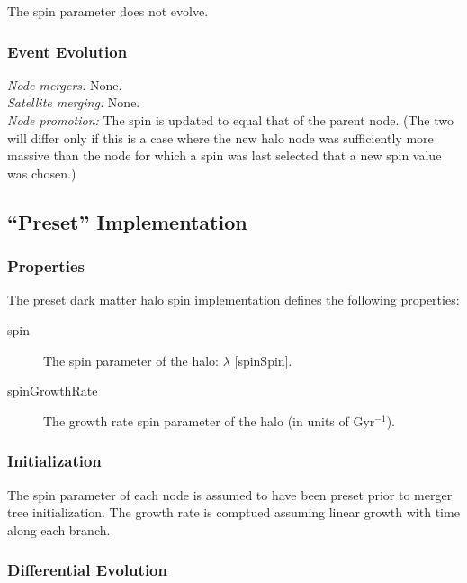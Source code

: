 The spin parameter does not evolve.

\subsubsection{Event Evolution}

\noindent\emph{Node mergers:} None.\\

\noindent\emph{Satellite merging:} None.\\

\noindent\emph{Node promotion:} The spin is updated to equal that of the parent node. (The two will differ only if this is a case where the new halo \gls{node} was sufficiently more massive than the \gls{node} for which a spin was last selected that a new spin value was chosen.)\\

\subsection{``Preset'' Implementation}

\subsubsection{Properties}

The preset dark matter halo spin implementation defines the following properties:
\begin{description}
 \item [{\normalfont \ttfamily spin}] The spin parameter of the halo: $\lambda$ [{\normalfont \ttfamily spinSpin}].
 \item [{\normalfont \ttfamily spinGrowthRate}] The growth rate spin parameter of the halo (in units of Gyr$^{-1}$).
\end{description}

\subsubsection{Initialization}

The spin parameter of each \gls{node} is assumed to have been preset prior to merger tree initialization. The growth rate is comptued assuming linear growth with time along each branch.

\subsubsection{Differential Evolution}

